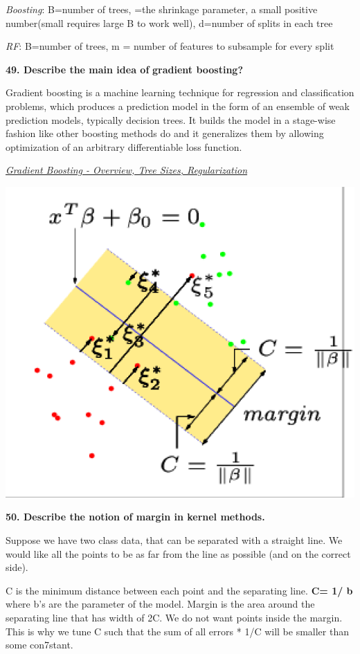 \textit{Boosting}: B=number of trees, \textcrlambda=the shrinkage parameter, a
small positive number(small \textcrlambda requires large B to work well), d=number
of splits in each tree

\textit{RF}: B=number of trees, m = number of features to subsample
for every split

\textbf{49. Describe the main idea of} \textbf{gradient boosting?}

Gradient boosting is a machine learning technique for regression and
classification problems, which produces a prediction model in the form
of an ensemble of weak prediction models, typically decision trees. It
builds the model in a stage-wise fashion like other boosting methods do
and it generalizes them by allowing optimization of an arbitrary
differentiable loss function.

\href{https://corporatefinanceinstitute.com/resources/knowledge/other/gradient-boosting/}{\textit{Gradient
Boosting - Overview, Tree Sizes,
Regularization}}

\includegraphics[width=\columnwidth]{media/image33.png}

\textbf{50. Describe the notion of margin in kernel methods.}

Suppose we have two class data, that can be separated with a straight
line. We would like all the points to be as far from the line as
possible (and on the correct side).

C is the minimum distance between each point and the separating line.
\textbf{C= 1/ \textbar b\textbar{}} where b's are the parameter of the
model. Margin is the area around the separating line that has width of
2C. We do not want points inside the margin. This is why we tune C such
that the sum of all errors * 1/C will be smaller than some con7stant.


